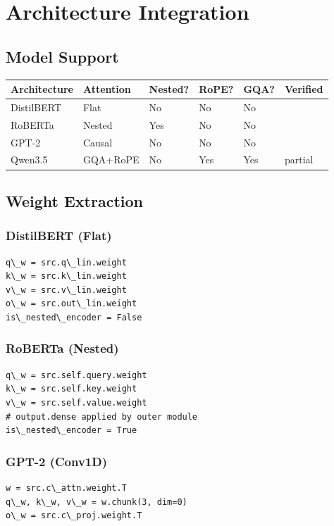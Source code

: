 \section{Architecture Integration}

\subsection{Model Support}

\begin{table}[H]
\centering
\small
\begin{tabular}{llllll}
\toprule
\textbf{Architecture} & \textbf{Attention} & \textbf{Nested?} & \textbf{RoPE?} & \textbf{GQA?} & \textbf{Verified} \\
\midrule
DistilBERT & Flat & No & No & No &  \\
RoBERTa & Nested & Yes & No & No &  \\
GPT-2 & Causal & No & No & No &  \\
Qwen3.5 & GQA+RoPE & No & Yes & Yes & partial \\
\bottomrule
\end{tabular}
\end{table}

\subsection{Weight Extraction}

\subsubsection{DistilBERT (Flat)}
\begin{lstlisting}
q\_w = src.q\_lin.weight
k\_w = src.k\_lin.weight
v\_w = src.v\_lin.weight
o\_w = src.out\_lin.weight
is\_nested\_encoder = False
\end{lstlisting}

\subsubsection{RoBERTa (Nested)}
\begin{lstlisting}
q\_w = src.self.query.weight
k\_w = src.self.key.weight
v\_w = src.self.value.weight
# output.dense applied by outer module
is\_nested\_encoder = True
\end{lstlisting}

\subsubsection{GPT-2 (Conv1D)}
\begin{lstlisting}
w = src.c\_attn.weight.T
q\_w, k\_w, v\_w = w.chunk(3, dim=0)
o\_w = src.c\_proj.weight.T
\end{lstlisting}

